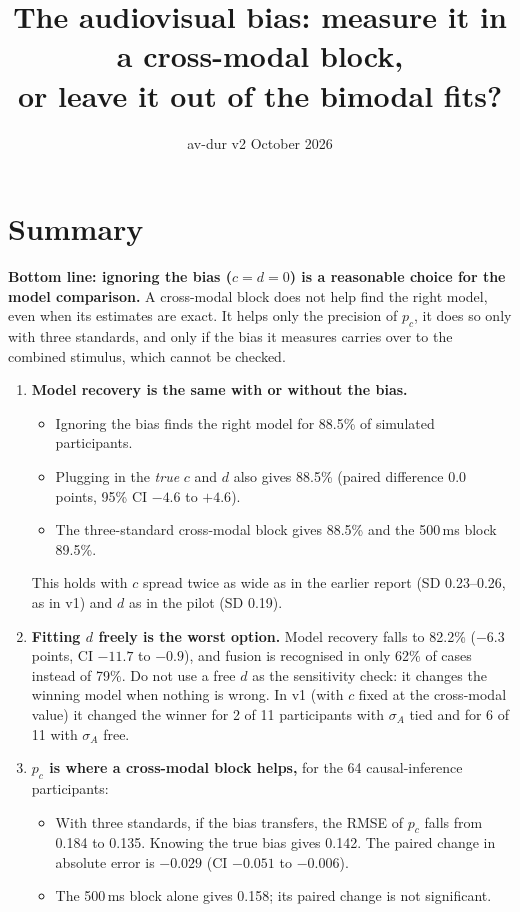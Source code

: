 \documentclass[11pt,a4paper]{article}
\title{The audiovisual bias: measure it in a cross-modal block,\\ or leave it out of the bimodal fits?}
\author{av-dur v2 \quad 30 October 2026}
\date{}
\newcommand{\pc}{p_c}
\begin{document}
\maketitle
\vspace{-1.5em}

\section*{Summary}
\textbf{Bottom line: ignoring the bias ($c = d = 0$) is a reasonable choice for the model comparison.} A cross-modal block does not help find the right model, even when its estimates are exact. It helps only the precision of $\pc$, it does so only with three standards, and only if the bias it measures carries over to the combined stimulus, which cannot be checked.
\begin{enumerate}
\item \textbf{Model recovery is the same with or without the bias.}
  \begin{itemize}
  \item Ignoring the bias finds the right model for 88.5\% of simulated participants.
  \item Plugging in the \emph{true} $c$ and $d$ also gives 88.5\% (paired difference 0.0 points, 95\% CI $-4.6$ to $+4.6$).
  \item The three-standard cross-modal block gives 88.5\% and the 500\,ms block 89.5\%.
  \end{itemize}
  This holds with $c$ spread twice as wide as in the earlier report (SD 0.23--0.26, as in v1) and $d$ as in the pilot (SD 0.19).
\item \textbf{Fitting $d$ freely is the worst option.} Model recovery falls to 82.2\% ($-6.3$ points, CI $-11.7$ to $-0.9$), and fusion is recognised in only 62\% of cases instead of 79\%. Do not use a free $d$ as the sensitivity check: it changes the winning model when nothing is wrong. In v1 (with $c$ fixed at the cross-modal value) it changed the winner for 2 of 11 participants with $\sigma_A$ tied and for 6 of 11 with $\sigma_A$ free.
\item \textbf{$\pc$ is where a cross-modal block helps,} for the 64 causal-inference participants:
  \begin{itemize}
  \item With three standards, if the bias transfers, the RMSE of $\pc$ falls from 0.184 to 0.135. Knowing the true bias gives 0.142. The paired change in absolute error is $-0.029$ (CI $-0.051$ to $-0.006$).
  \item The 500\,ms block alone gives 0.158; its paired change is not significant.

\end{itemize}
\end{enumerate}
\end{document}
